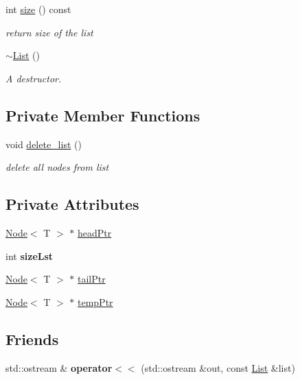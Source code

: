 \begin{DoxyCompactItemize}
int \hyperlink{class_list_a2f8c57c710d2e9052f29a60af4c514ae}{size} () const 
\begin{DoxyCompactList}\small\item\em return size of the list \end{DoxyCompactList}\item 
\hyperlink{class_list_a2b58189090f6e5ce52939c9195e59e85}{$\sim$\+List} ()
\begin{DoxyCompactList}\small\item\em A destructor. \end{DoxyCompactList}\end{DoxyCompactItemize}
\subsection*{Private Member Functions}
\begin{DoxyCompactItemize}
\item 
void \hyperlink{class_list_acba757cd4643bf99859ffd710b941983}{delete\+\_\+list} ()
\begin{DoxyCompactList}\small\item\em delete all nodes from list \end{DoxyCompactList}\end{DoxyCompactItemize}
\subsection*{Private Attributes}
\begin{DoxyCompactItemize}
\item 
\hyperlink{class_node}{Node}$<$ T $>$ $\ast$ \hyperlink{class_list_a458d07dddccbd1f2658c507ae4a88b85}{head\+Ptr}
\item 
\hypertarget{class_list_a47c59c2a737b6866511ea709ce832804}{}int {\bfseries size\+Lst}\label{class_list_a47c59c2a737b6866511ea709ce832804}

\item 
\hyperlink{class_node}{Node}$<$ T $>$ $\ast$ \hyperlink{class_list_ae2eb29a2f13bad16ac2617217576e3ea}{tail\+Ptr}
\item 
\hyperlink{class_node}{Node}$<$ T $>$ $\ast$ \hyperlink{class_list_a9a6f2723e2a68e2193850ff649b126d4}{temp\+Ptr}
\end{DoxyCompactItemize}
\subsection*{Friends}
\begin{DoxyCompactItemize}
\item 
\hypertarget{class_list_a4c7712bf47d8f2bdf5dfd1c828c92129}{}std\+::ostream \& {\bfseries operator$<$$<$} (std\+::ostream \&out, const \hyperlink{class_list}{List} \&list)\label{class_list_a4c7712bf47d8f2bdf5dfd1c828c92129}

\end{DoxyCompactItemize}


